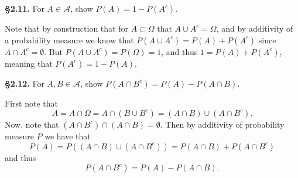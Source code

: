\documentclass[11pt,reqno]{amsart}
\newcommand{\tbox}[2]{\begin{tcolorbox}[colback=white, sharp corners]\textbf{\S#1.} #2 \end{tcolorbox}}
\begin{document}
\tbox{2.11}{ 
    For $A \in \mathcal{A}$, show $P(A) = 1 - P(A^c)$.
}
Note that by construction that for $A \subset \Omega$ that $A \cup A^c= \Omega$, and by additivity of a probability measure we know that $P(A\cup A^c)=P(A)+P(A^c)$ since $A \cap A^c= \emptyset$. 
But $P(A\cup A^c) = P(\Omega) = 1$, and thus $1 = P(A) + P(A^c)$, meaning that $P(A^c) = 1 - P(A)$.

\tbox{2.12}{
For $A,B \in \mathcal{A}$, show $P(A \cap B^c) = P(A)-P(A \cap B)$.
}
First note that
$$
    A = A \cap \Omega =A\cap (B\cup B^c)=(A\cap B) \cup (A\cap B^c).
$$ 
Now, note that $(A\cap B^c) \cap (A\cap B) = \emptyset$. 
Then by additivity of probability measure $P$ we have that 
$$
P(A)=P((A\cap B) \cup (A \cap B^c))=P(A \cap B) + P( A\cap B^c)
$$
and thus 
$$
P(A \cap B^c) = P(A)-P(A \cap B).
$$
\end{document}
